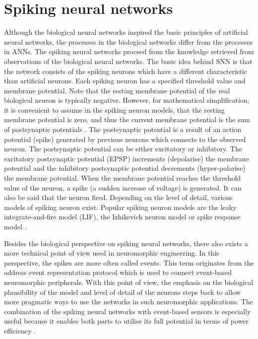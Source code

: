 \section{Spiking neural networks}
Although the biological neural networks inspired the basic principles of artificial neural networks, the processes in the biological networks differ from the processes in ANNs. The spiking neural networks proceed from the knowledge retrieved from observations of the biological neural networks. The basic idea behind SNN is that the network consists of the spiking neurons which have a different characteristic than artificial neurons. Each spiking neuron has a specified threshold value and membrane potential. Note that the resting membrane potential of the real biological neuron is typically negative. However, for mathematical simplification, it is convenient to assume in the spiking neuron models, that the resting membrane potential is zero, and thus the current membrane potential is the sum of postsynaptic potentials \cite{maassNetworksSpikingNeurons1997}. The postsynaptic potential is a result of an action potential (spike) generated by previous neurons which connects to the observed neuron. The postsynaptic potential can be either excitatory or inhibitory. The excitatory postsynaptic potential (EPSP) increments (depolarise) the membrane potential and the inhibitory postsynaptic potential decrements (hyper-polarise) the membrane potential. When the membrane potential reaches the threshold value of the neuron, a spike (a sudden increase of voltage) is generated. It can also be said that the neuron fired. Depending on the level of detail, various models of spiking neuron exist. Popular spiking neuron models are the leaky integrate-and-fire model (LIF), the Izhikevich neuron model or spike response model \cite{tavanaeiDeepLearningSpiking2019}. \par
Besides the biological perspective on spiking neural networks, there also exists a more technical point of view used in neuromorphic engineering. In this perspective, the spikes are more often called events. This term originates from the address event representation protocol \cite{pazTestInfrastructureAddressEventRepresentation2005, boahenPointtopointConnectivity00} which is used to connect event-based neuromorphic peripherals. With this point of view, the emphasis on the biological plausibility of the model and level of detail of the neurons steps back to allow more pragmatic ways to use the networks in such neuromorphic applications. The combination of the spiking neural networks with event-based sensors is especially useful because it enables both parts to utilise its full potential in terms of power efficiency \cite{pfeifferDeepLearningSpiking2018}.

